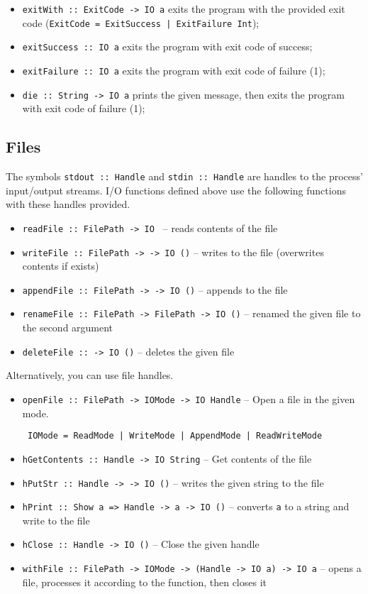 \begin{itemize}
  \item \texttt{exitWith :: ExitCode -> IO a} exits the program with the provided exit code (\texttt{ExitCode = ExitSuccess | ExitFailure Int});
  \item \texttt{exitSuccess :: IO a} exits the program with exit code of success;
  \item \texttt{exitFailure :: IO a} exits the program with exit code of failure (1);
  \item \texttt{die :: String -> IO a} prints the given message, then exits the program with exit code of failure (1);
\end{itemize}

\subsection{Files}
The symbols \texttt{stdout :: Handle} and \texttt{stdin :: Handle} are handles to the process' input/output streams. I/O functions defined above use the following functions with these handles provided.

\begin{itemize}
  \item \texttt{readFile :: FilePath -> IO } -- reads contents of the file
  \item \texttt{writeFile :: FilePath ->  -> IO ()} -- writes to the file (overwrites contents if exists)
  \item \texttt{appendFile :: FilePath ->  -> IO ()} -- appends to the file
  \item \texttt{renameFile :: FilePath -> FilePath -> IO ()} -- renamed the given file to the second argument
  \item \texttt{deleteFile ::  -> IO ()} -- deletes the given file
\end{itemize}

Alternatively, you can use file handles.
\begin{itemize}
  \item \texttt{openFile :: FilePath -> IOMode -> IO Handle} -- Open a file in the given mode.
  
  \texttt{ IOMode = ReadMode | WriteMode | AppendMode | ReadWriteMode}
  \item \texttt{hGetContents :: Handle -> IO String} -- Get contents of the file
  \item \texttt{hPutStr :: Handle ->  -> IO ()} -- writes the given string to the file
  \item \texttt{hPrint :: Show a => Handle -> a -> IO ()} -- converts \texttt{a} to a string and write to the file
  \item \texttt{hClose :: Handle -> IO ()} -- Close the given handle
  \item \texttt{withFile :: FilePath -> IOMode -> (Handle -> IO a) -> IO a} -- opens a file, processes it according to the function, then closes it
\end{itemize}
